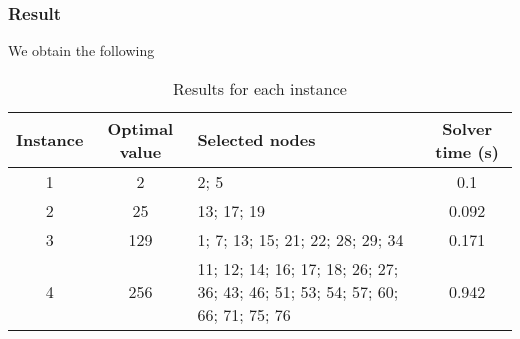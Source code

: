 \newpage

\subsubsection*{Result}
We obtain the following

\begin{table}[h]
	\centering
	\begin{tabularx}{\textwidth}{|c|c|X|c|}
		\hline
		\textbf{Instance} & \textbf{Optimal value} & \textbf{Selected nodes} & \textbf{Solver time (s)} \\
		\hline
		1 & 2 & 2; 5 & 0.1 \\
		\hline
		2 & 25 & 13; 17; 19 & 0.092 \\
		\hline
		3 & 129 & 1; 7; 13; 15; 21; 22; 28; 29; 34 & 0.171 \\
		\hline
		4 & 256 & 11; 12; 14; 16; 17; 18; 26; 27; 36; 43; 46; 51; 53; 54; 57; 60; 66; 71; 75; 76 & 0.942 \\
		\hline
	\end{tabularx}
	\caption{Results for each instance}
	\label{tab:instance_costs}
\end{table}
